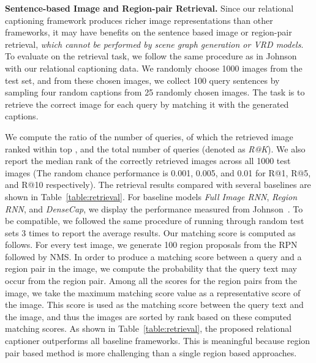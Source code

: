 \documentclass[10pt,twocolumn,letterpaper]{article}
\begin{document}
\noindent\textbf{Sentence-based Image and Region-pair Retrieval.}
Since our relational captioning framework produces richer image representations than other frameworks, it may have benefits on the sentence based image or region-pair retrieval, \emph{which {cannot} be performed by scene graph generation or VRD models}.
To evaluate on the retrieval task, we follow the same procedure as in Johnson~\etal\cite{johnson2016densecap} with {our relational captioning data.}
We randomly choose 1000 images from the test set, and from these chosen images, we collect 100 query sentences by sampling four random captions from 25 randomly chosen images.
The task is to retrieve the correct image for each query by matching it with the generated captions.

We compute the ratio of the number of queries, of which the retrieved image ranked within top , and the total number of queries (denoted as \emph{R@K}).
We also report the median rank of the correctly retrieved images across all 1000 test images ({The random chance performance is 0.001, 0.005, and 0.01 for R@1, R@5, and R@10 respectively}).
The retrieval results compared with several baselines are shown in Table~\ref{table:retrieval}.
For baseline models \emph{Full Image RNN}, \emph{Region RNN}, and \emph{DenseCap}, we display the performance measured from Johnson~\etal\cite{johnson2016densecap}.
To be compatible, we followed the same procedure of running through random test sets 3 times to report the average results.
Our matching score is computed as follows.
For every test image, we generate 100 region proposals from the RPN followed by NMS.
In order to produce a matching score between a query and a region pair in the image, we compute the probability that the query text may occur from the region pair.
Among all the scores for the region pairs from the image, we take the maximum matching score value as a representative score of the image.
This score is used as the matching score between the query text and the image, and thus the images are sorted by rank based on these computed matching scores.
As shown in Table~\ref{table:retrieval}, the proposed relational captioner outperforms all baseline frameworks. 
{This is meaningful because region pair based method is more challenging than a single region based approaches.}
\end{document}
